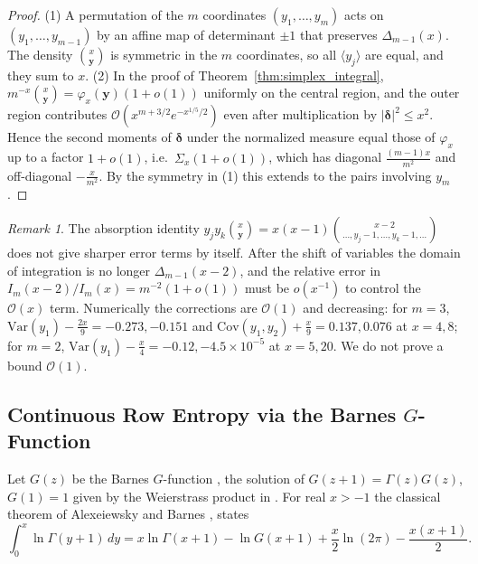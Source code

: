 \documentclass[11pt,a4paper]{article}
\theoremstyle{plain}
\theoremstyle{definition}
\theoremstyle{remark}
\newtheorem{remark}[theorem]{Remark}
\numberwithin{equation}{section}
\begin{document}
\begin{proof}
(1) A permutation of the $m$ coordinates $(y_1, \dots, y_m)$ acts on $(y_1, \dots, y_{m-1})$ by an affine map of determinant $\pm 1$ that preserves $\Delta_{m-1}(x)$. The density $\binom{x}{\mathbf{y}}$ is symmetric in the $m$ coordinates, so all $\langle y_j \rangle$ are equal, and they sum to $x$.
(2) In the proof of Theorem~\ref{thm:simplex_integral}, $m^{-x}\binom{x}{\mathbf{y}} = \varphi_x(\mathbf{y})(1 + o(1))$ uniformly on the central region, and the outer region contributes $\mathcal{O}(x^{m+3/2}e^{-x^{1/5}/2})$ even after multiplication by $|\boldsymbol{\delta}|^2 \le x^2$. Hence the second moments of $\boldsymbol{\delta}$ under the normalized measure equal those of $\varphi_x$ up to a factor $1 + o(1)$, i.e.\ $\Sigma_x(1 + o(1))$, which has diagonal $\frac{(m-1)x}{m^2}$ and off-diagonal $-\frac{x}{m^2}$. By the symmetry in (1) this extends to the pairs involving $y_m$.
\end{proof}

\begin{remark}
The absorption identity $y_j y_k \binom{x}{\mathbf{y}} = x(x-1)\binom{x-2}{\dots, y_j - 1, \dots, y_k - 1, \dots}$ does not give sharper error terms by itself. After the shift of variables the domain of integration is no longer $\Delta_{m-1}(x-2)$, and the relative error in $I_m(x-2)/I_m(x) = m^{-2}(1 + o(1))$ must be $o(x^{-1})$ to control the $\mathcal{O}(x)$ term. Numerically the corrections are $\mathcal{O}(1)$ and decreasing: for $m = 3$, $\mathrm{Var}(y_1) - \frac{2x}{9} = -0.273, -0.151$ and $\mathrm{Cov}(y_1, y_2) + \frac{x}{9} = 0.137, 0.076$ at $x = 4, 8$; for $m = 2$, $\mathrm{Var}(y_1) - \frac{x}{4} = -0.12, -4.5 \times 10^{-5}$ at $x = 5, 20$. We do not prove a bound $\mathcal{O}(1)$.
\end{remark}

\subsection{Continuous Row Entropy via the Barnes \texorpdfstring{$G$}{G}-Function}

Let $G(z)$ be the Barnes $G$-function \cite{barnes1900}, the solution of $G(z+1) = \Gamma(z)G(z)$, $G(1) = 1$ given by the Weierstrass product in \cite[Eq.~5.17.3]{dlmf517}. For real $x > -1$ the classical theorem of Alexeiewsky and Barnes \cite[Sec.~6]{adamchik2003barnes}, \cite[Eq.~5.17.4]{dlmf517} states
\begin{equation}
\label{eq:alexeiewsky}
\int_0^x \ln\Gamma(y+1)\,dy = x\ln\Gamma(x+1) - \ln G(x+1) + \frac{x}{2}\ln(2\pi) - \frac{x(x+1)}{2}.
\end{equation}
\end{document}
